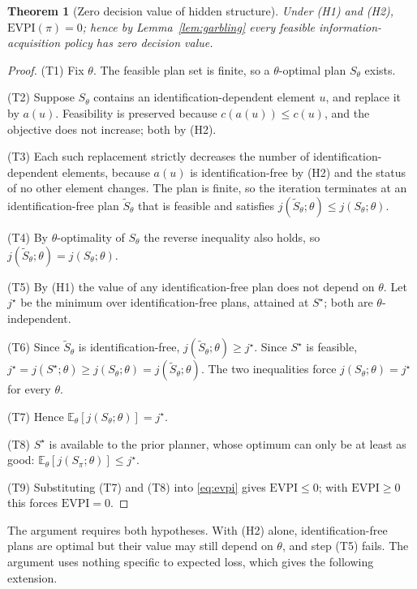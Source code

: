 \documentclass[pdflatex,sn-mathphys-num]{sn-jnl}
\theoremstyle{thmstyleone}
\newtheorem{theorem}{Theorem}
\theoremstyle{thmstyletwo}
\theoremstyle{thmstylethree}
\newcommand{\evpi}{\mathrm{EVPI}}
\begin{document}
\begin{theorem}[Zero decision value of hidden structure]\label{thm:zero}
Under (H1) and (H2), $\evpi(\pi)=0$; hence by Lemma~\ref{lem:garbling} every
feasible information-acquisition policy has zero decision value.
\end{theorem}

\begin{proof}
(T1) Fix $\theta$. The feasible plan set is finite, so a $\theta$-optimal
plan $S_\theta$ exists.

\noindent(T2) Suppose $S_\theta$ contains an identification-dependent
element $u$, and replace it by $a(u)$. Feasibility is preserved because
$c(a(u))\le c(u)$, and the objective does not increase; both by (H2).

\noindent(T3) Each such replacement strictly decreases the number of
identification-dependent elements, because $a(u)$ is identification-free by
(H2) and the status of no other element changes. The plan is finite, so the
iteration terminates at an identification-free plan $\tilde S_\theta$ that
is feasible and satisfies
$j(\tilde S_\theta;\theta)\le j(S_\theta;\theta)$.

\noindent(T4) By $\theta$-optimality of $S_\theta$ the reverse inequality
also holds, so $j(\tilde S_\theta;\theta)=j(S_\theta;\theta)$.

\noindent(T5) By (H1) the value of any identification-free plan does not
depend on $\theta$. Let $j^\star$ be the minimum over identification-free
plans, attained at $S^\star$; both are $\theta$-independent.

\noindent(T6) Since $\tilde S_\theta$ is identification-free,
$j(\tilde S_\theta;\theta)\ge j^\star$. Since $S^\star$ is feasible,
$j^\star=j(S^\star;\theta)\ge j(S_\theta;\theta)=j(\tilde S_\theta;\theta)$.
The two inequalities force $j(S_\theta;\theta)=j^\star$ for every $\theta$.

\noindent(T7) Hence $\mathbb{E}_\theta[j(S_\theta;\theta)]=j^\star$.

\noindent(T8) $S^\star$ is available to the prior planner, whose optimum can
only be at least as good:
$\mathbb{E}_\theta[j(S_\pi;\theta)]\le j^\star$.

\noindent(T9) Substituting (T7) and (T8) into \eqref{eq:evpi} gives
$\evpi\le0$; with $\evpi\ge0$ this forces $\evpi=0$.
\end{proof}

The argument requires both hypotheses. With (H2) alone, identification-free
plans are optimal but their value may still depend on $\theta$, and step (T5)
fails. The argument uses nothing specific to expected loss, which gives the
following extension.
\end{document}
